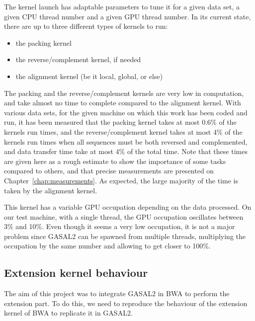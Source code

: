 The kernel launch has adaptable parameters to tune it for a given data set, a given CPU thread number and a given GPU thread number. In its current state, there are up to three different types of kernels to run:

\begin{itemize}
	\item the packing kernel
	\item the reverse/complement kernel, if needed
	\item the alignment kernel (be it local, global, or else)
\end{itemize}

The packing and the reverse/complement kernels are very low in computation, and take almost no time to complete compared to the alignment kernel. With various data sets, for the given machine on which this work has been coded and run, it has been measured that the packing kernel takes at most 0.6\% of the kernels run times, and the reverse/complement kernel takes at most 4\% of the kernels run times when all sequences must be both reversed and complemented, and data transfer time take at most 4\% of the total time. Note that these times are given here as a rough estimate to show the importance of some tasks compared to others, and that precise measurements are presented on Chapter~\ref{chap:measurements}. As expected, the large majority of the time is taken by the alignment kernel.

This kernel has a variable GPU occupation depending on the data processed. On our test machine, with a single thread, the GPU occupation oscillates between 3\% and 10\%. Even though it seems a very low occupation, it is not a major problem since GASAL2 can be spawned from multiple threads, multiplying the occupation by the same number and allowing to get closer to 100\%.


\subsection{Extension kernel behaviour}
\label{sec:seedonly}
The aim of this project was to integrate GASAL2 in BWA to perform the extension part. To do this, we need to reproduce the behaviour of the extension kernel of BWA to replicate it in GASAL2.

